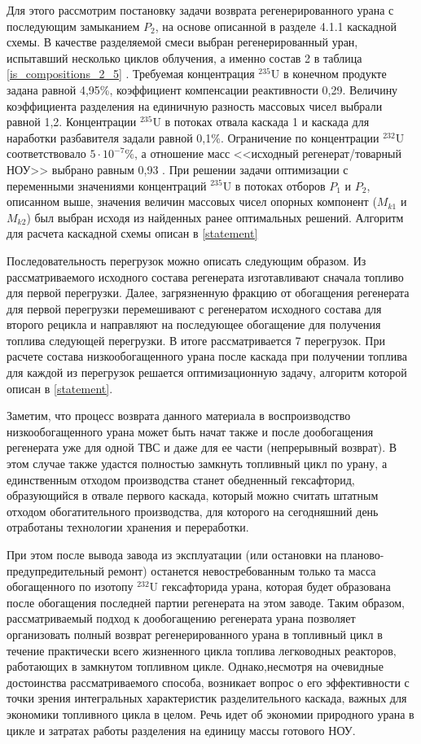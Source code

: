 Для этого рассмотрим постановку задачи возврата регенерированного урана с последующим замыканием $P_2$, на основе описанной в разделе 4.1.1 каскадной схемы. В качестве разделяемой смеси выбран регенерированный уран, испытавший несколько циклов облучения, а именно состав 2 в таблица \ref{is_compositions_2_5} \cite{smirnovObogashchenieRegenerirovannogoUrana2018}. Требуемая концентрация $^{235}$U в конечном продукте задана равной 4,95\%, коэффициент компенсации реактивности 0,29. Величину коэффициента разделения на единичную разность массовых чисел выбрали равной 1,2. Концентрации $^{235}$U в потоках отвала каскада 1 и каскада для наработки разбавителя задали равной 0,1\%. Ограничение по концентрации $^{232}$U соответствовало $5\cdot10^{-7} \%$, а отношение масс <<исходный регенерат/товарный НОУ>> выбрано равным 0,93 \cite{smirnovObogashchenieRegenerirovannogoUrana2018}.  При решении задачи оптимизации с переменными значениями концентраций $^{235}$U в потоках отборов $P_1$ и $P_2$, описанном выше, значения величин массовых чисел опорных компонент ($M_{k1}$ и $M_{k2}$) был выбран исходя из найденных ранее оптимальных решений. Алгоритм для расчета каскадной схемы описан в \ref{statement}

Последовательность перегрузок можно описать следующим образом. Из рассматриваемого исходного состава регенерата изготавливают сначала топливо для первой перегрузки. Далее, загрязненную фракцию от обогащения регенерата для первой перегрузки перемешивают с регенератом исходного состава для второго рецикла и направляют на последующее обогащение для получения топлива следующей перегрузки. В итоге рассматривается 7 перегрузок. При расчете состава низкообогащенного урана после каскада при получении топлива для каждой из перегрузок решается оптимизационную задачу, алгоритм которой описан в \ref{statement}.

Заметим, что процесс возврата данного материала в воспроизводство низкообогащенного урана может быть начат также и после дообогащения регенерата уже для одной ТВС и даже для ее части (непрерывный возврат). В этом случае также удастся полностью замкнуть топливный цикл по урану, а единственным отходом производства станет обедненный гексафторид, образующийся в отвале первого каскада, который можно считать штатным отходом обогатительного производства, для которого на сегодняшний день отработаны технологии хранения и переработки.

При этом после вывода завода из эксплуатации (или остановки на планово-предупредительный ремонт) останется невостребованным только та масса обогащенного по изотопу $^{232}$U гексафторида урана, которая будет образована после обогащения последней партии регенерата на этом заводе. Таким образом, рассматриваемый подход к дообогащению регенерата урана позволяет организовать полный возврат регенерированного урана в топливный цикл в течение практически всего жизненного цикла топлива легководных реакторов, работающих в замкнутом топливном цикле. Однако,несмотря на очевидные достоинства рассматриваемого способа, возникает вопрос о его эффективности с точки зрения интегральных характеристик разделительного каскада, важных для экономики топливного цикла в целом. Речь идет об экономии природного урана в цикле и затратах работы разделения на единицу массы готового НОУ.


